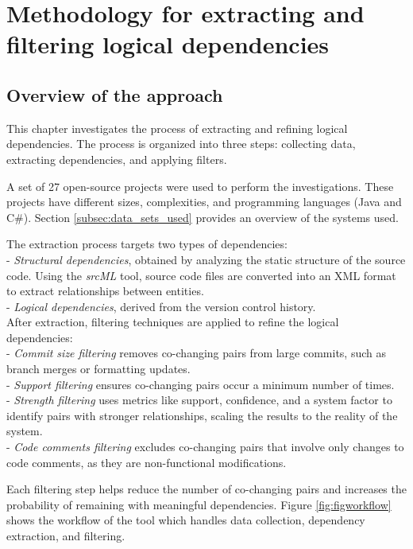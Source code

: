 \chapter{Methodology for extracting and filtering logical dependencies}
\label{extraction}

\section{Overview of the approach}
\label{sec:overview_approach}

\hspace{4em}This chapter investigates the process of extracting and refining logical dependencies. The process is organized into three steps: collecting data, extracting dependencies, and applying filters.

A set of 27 open-source projects were used to perform the investigations. These projects have different sizes, complexities, and programming languages (Java and C\#). Section \ref{subsec:data_sets_used} provides an overview of the systems used.

The extraction process targets two types of dependencies:\\
- \textit{Structural dependencies}, obtained by analyzing the static structure of the source code. Using the \textit{srcML} tool, source code files are converted into an XML format to extract relationships between entities. \\
- \textit{Logical dependencies}, derived from the version control history. \\

After extraction, filtering techniques are applied to refine the logical dependencies:\\
- \textit{Commit size filtering} removes co-changing pairs from large commits, such as branch merges or formatting updates.\\
- \textit{Support filtering} ensures co-changing pairs occur a minimum number of times.\\
- \textit{Strength filtering} uses metrics like support, confidence, and a system factor to identify pairs with stronger relationships, scaling the results to the reality of the system.\\
- \textit{Code comments filtering} excludes co-changing pairs that involve only changes to code comments, as they are non-functional modifications.  

Each filtering step helps reduce the number of co-changing pairs and increases the probability of remaining with meaningful dependencies. Figure \ref{fig:figworkflow} shows the workflow of the tool which handles data collection, dependency extraction, and filtering. 



